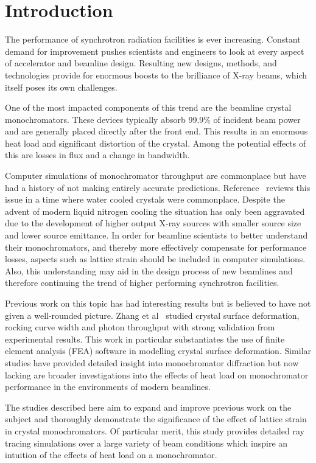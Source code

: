\documentclass{iucr}
\begin{document}
\section{Introduction}

The performance of synchrotron radiation facilities is ever increasing. Constant demand for improvement pushes scientists and engineers to look at every aspect of accelerator and beamline design. Resulting new designs, methods, and technologies provide for enormous boosts to the brilliance of X-ray beams, which itself poses its own challenges.

One of the most impacted components of this trend are the beamline crystal monochromators. These devices typically absorb 99.9\% of incident beam power~\cite{willmott} and are generally placed directly after the front end. This results in an enormous heat load and significant distortion of the crystal. Among the potential effects of this are losses in flux and a change in bandwidth.

Computer simulations of monochromator throughput are commonplace but have had a history of not making entirely accurate predictions. Reference~\cite{innacuratepredictions} reviews this issue in a time where water cooled crystals were commonplace. Despite the advent of modern liquid nitrogen cooling the situation has only been aggravated due to the development of higher output X-ray sources with smaller source size and lower source emittance. In order for beamline scientists to better understand their monochromators, and thereby more effectively compensate for performance losses, aspects such as lattice strain should be included in computer simulations. Also, this understanding may aid in the design process of new beamlines and therefore continuing the trend of higher performing synchrotron facilities.

Previous work on this topic has had interesting results but is believed to have not given a well-rounded picture. Zhang et al~\cite{Zhang} studied crystal surface deformation, rocking curve width and photon throughput with strong validation from experimental results. This work in particular substantiates the use of finite element analysis (FEA) software in modelling crystal surface deformation. Similar studies have provided detailed insight into monochromator diffraction but now lacking are broader investigations into the effects of heat load on monochromator performance in the environments of modern beamlines.

The studies described here aim to expand and improve previous work on the subject and thoroughly demonstrate the significance of the effect of lattice strain in crystal monochromators. Of particular merit, this study provides detailed ray tracing simulations over a large variety of beam conditions which inspire an intuition of the effects of heat load on a monochromator.
\end{document}
